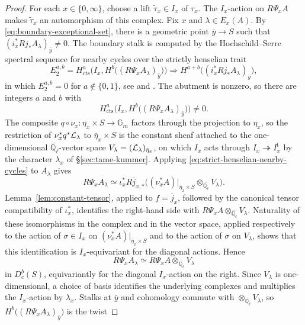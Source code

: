\documentclass[12pt,reqno]{amsart}
\theoremstyle{definition}
\theoremstyle{plain}
\theoremstyle{definition}
\theoremstyle{remark}
\newcommand{\bbG}{\mathbb{G}}  \newcommand{\bbH}{\mathbb{H}}
\newcommand{\bbQ}{\mathbb{Q}}  \newcommand{\bbR}{\mathbb{R}}
\newcommand{\ol}[1]{\overline{#1}}
\newcommand{\Ql}{\bbQ_{\ell}}
\newcommand{\Db}{D^b_c}
\newcommand{\Gm}{\bbG_m}
\begin{document}
\begin{proof}
For each \(x\in\{0,\infty\}\), choose a lift
\(\widetilde\tau_x\in I_x\) of \(\tau_x\).  The \(I_x\)-action on \(R\Psi_x A\) makes
\(\widetilde\tau_x\) an automorphism of this complex.
Fix \(x\) and \(\lambda\in E_x(A)\).  By \eqref{eq:boundary-exceptional-set}, there is a geometric point
\(\bar y\to S\) such that \((i_x^*Rj_*A_\lambda)_{\bar y}\neq0\).  The boundary stalk is computed by the
Hochschild--Serre spectral sequence for nearby cycles over the strictly henselian trait
\[
        E_2^{a,b}
        =H^a_{\mathrm{cts}}\bigl(I_x,H^b\bigl((R\Psi_x A_\lambda)_{\bar y}\bigr)\bigr)
        \Longrightarrow
        H^{a+b}\bigl((i_x^*Rj_*A_\lambda)_{\bar y}\bigr),
\]
in which \(E_2^{a,b}=0\) for \(a\notin\{0,1\}\), see \cite[\textit{Th\'eor\`emes de finitude},
Lem.~3.11]{SGA45} and \cite[Th.~(6.5)]{KatzLaumon1985}.  The abutment is nonzero, so there are
integers \(a\) and \(b\) with
\[
        H^a_{\mathrm{cts}}\bigl(I_x,H^b\bigl((R\Psi_x A_\lambda)_{\bar y}\bigr)\bigr)\neq0.
\]
The composite \(q\circ\nu_x:\eta_x\times S\to\Gm\) factors through the projection to \(\eta_x\), so the
restriction of \(\nu_x^*q^*\mathcal{L}_\lambda\) to \(\bar\eta_x\times S\) is the constant sheaf attached to the
one-dimensional \(\ol\Ql\)-vector space \(V_\lambda=(\mathcal{L}_\lambda)_{\bar\eta_x}\), on which \(I_x\) acts
through \(I_x\twoheadrightarrow I_x^{\mathrm t}\) by the character \(\lambda_x\) of
\S\ref{sec:tame-kummer}.  Applying \eqref{eq:strict-henselian-nearby-cycles} to \(A_\lambda\) gives
\[
        R\Psi_x A_\lambda\simeq
        \iota_x^*R\bar j_{x,*}
        \bigl((\nu_x^*A)|_{\bar\eta_x\times S}\otimes_{\ol\Ql}V_\lambda\bigr).
\]
Lemma~\ref{lem:constant-tensor}, applied to \(f=\bar j_x\), followed by the canonical tensor
compatibility of \(\iota_x^*\), identifies the right-hand side with
\(R\Psi_x A\otimes_{\ol\Ql}V_\lambda\).  Naturality of these isomorphisms in the complex and in the
vector space, applied respectively to the action of \(\sigma\in I_x\) on
\((\nu_x^*A)|_{\bar\eta_x\times S}\) and to the action of \(\sigma\) on \(V_\lambda\), shows that this
identification is \(I_x\)-equivariant for the diagonal actions.
Hence
\[
        R\Psi_x A_\lambda\simeq R\Psi_x A\otimes_{\ol\Ql}V_\lambda
\]
in \(\Db(S)\), equivariantly for the diagonal \(I_x\)-action on the right.  Since \(V_\lambda\) is
one-dimensional, a choice of basis identifies the underlying complexes and multiplies the
\(I_x\)-action by \(\lambda_x\).  Stalks at \(\bar y\) and cohomology commute with
\(\otimes_{\ol\Ql}V_\lambda\), so \(H^b\bigl((R\Psi_x A_\lambda)_{\bar y}\bigr)\) is the twist

\end{proof}
\end{document}
